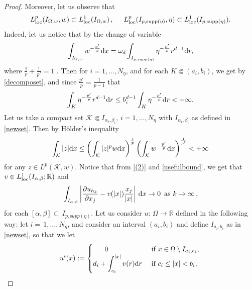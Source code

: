 \documentclass[11pt,leqno]{amsart}
\theoremstyle{remark}
\theoremstyle{definition}
\theoremstyle{definition}
\newcommand{\supp}{\mathrm{supp}}
\newcommand{\bbR}{{\mathbb{R}}}
\newcommand{\R}{\bbR}
\def\de{{\rm d}}
\newcommand{\hol}[1]{\"{#1}}
\begin{document}
\begin{proof}
Moreover, let us observe that
\begin{equation*}\label{(3)}
L^{p}_{\rm{loc}}(I_{\Omega,w},w)\subset L^1_{\rm{loc}}(I_{\Omega,w})\,, \hskip 0,5cm L^{p}_{\rm{loc}}(I_{p,\supp(\eta)},\eta)\subset L^1_{\rm{loc}}(I_{p,\supp(\eta)}).
\end{equation*}
Indeed, let us notice that by the change of variable
\begin{align*}
\displaystyle\int_{I_{\Omega,w}} w^{-\frac{p'}{p}} \de x=\omega_{d}\displaystyle\int_{I_{p,\supp(\eta)}} \eta^{-\frac{p'}{p}}r^{d-1} \de r,
\end{align*}
where $\frac{1}{p}+\frac{1}{p'}=1$ . Then for $i=1,\ldots, N_{\eta}$, and for each $K\Subset (a_{i},b_{i})$, we get by \eqref{decomposet}, and since $\frac{p'}{p}=\frac{1}{p-1}$ that
\begin{align*}
\displaystyle\int_{K} \eta^{-\frac{p'}{p}}r^{d-1} \de r\leq b_{i}^{d-1}\displaystyle\int_{K} \eta^{-\frac{p'}{p}}\de r<+\infty.
\end{align*}
Let us take a compact set $\mathcal{K}\Subset I_{\alpha_{i},\beta_{i}}$, $i=1,\ldots, N_{\eta}$ with $I_{\alpha_{i},\beta_{i}}$ as defined in \eqref{newset}. Then by H\hol{o}lder's inequality
\begin{align}
\label{usefulbound}
\displaystyle\int_{\mathcal{K}}\vert  z\vert \de x\leq \left(\displaystyle\int_{\mathcal{K}}\vert  z\vert^{p}w\de x\right)^{\frac{1}{p}}\left(\displaystyle\int_{\mathcal{K}} w^{-\frac{p'}{p}} \de x\right)^{\frac{1}{p'}}<+\infty
\end{align}
for any $z\in L^{p}(\mathcal{K},w)$. Notice that from \eqref{(2)} and \eqref{usefulbound}, we get that $v\in L^1_{\rm{loc}}(I_{\alpha,\beta};\mathbb{R})$ and
\begin{equation*}\label{4}
\displaystyle\int_{I_{\alpha,\beta}} \left\vert \frac{\partial u_{h_k}}{\partial x_{j}}- v(\vert x\vert)\frac{x_{j}}{\vert x\vert}\right\vert \,\de x\rightarrow 0\, \text{ as }k\to\infty\,,
\end{equation*}
for each $[\alpha,\beta]\subset\,I_{p,{\mathrm supp}(\eta)}$.
Let us consider $u:\,\Omega\to\R$ defined in the following way:  let $i=\,1,\dots,N_\eta$, and consider an interval $(a_{i}, b_{i})$ and define $I_{a_{i},b_{i}}$ as in \eqref{newset}, so that we let
\begin{equation*}
u^{i}(x):=
\begin{cases}
\ \ \ \ \ 0 \ \ \ \ &\text{ if } x\in\Omega\setminus I_{a_{i},b_{i}},\,
\\
\displaystyle d_{i}+\int_{c_{i}}^{\vert x\vert}v(r)\de r&\text{ if } c_{i}\leq \vert x\vert<b_{i},\\

\end{cases}
\end{equation*}
\end{proof}
\end{document}
